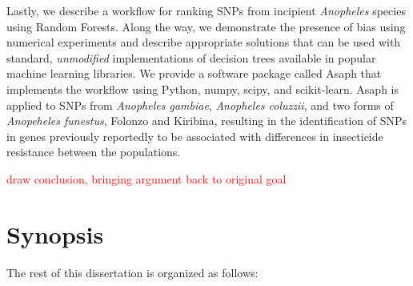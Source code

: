Lastly, we describe a workflow for ranking SNPs from incipient \emph{Anopheles} species using Random Forests.  Along the way, we demonstrate the presence of bias using numerical experiments and describe appropriate solutions that can be used with standard, \emph{unmodified} implementations of decision trees available in popular machine learning libraries. We provide a software package called Asaph that implements the workflow using Python, numpy, scipy, and scikit-learn.  Asaph is applied to SNPs from \emph{Anopheles gambiae}, \emph{Anopheles coluzzii}, and two forms of \emph{Anopeheles funestus}, Folonzo and Kiribina, resulting in the identification of SNPs in genes previously reportedly to be associated with differences in insecticide resistance between the populations.

\textcolor{red}{draw conclusion, bringing argument back to original goal}

\section{Synopsis}
The rest of this dissertation is organized as follows:

